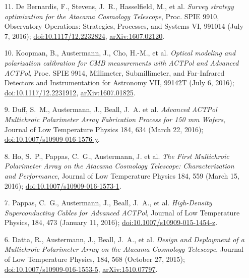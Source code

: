 \documentclass[margin,line]{res}
\begin{document}
\begin{resume}
\begin{enumerate}
{    the Advanced ACTPol experiment}, Proc. SPIE 9914, Millimeter, Submillimeter,
    and Far-Infrared Detectors and Instrumentation for Astronomy VII, 991437 (July
    19, 2016); \href{http://dx.doi.org/10.1117/12.2232824}{doi:10.1117/12.2233746}.
\item[{11.}] De Bernardis, F., Stevens, J.~R., Hasselfield, M., et al.
    \textit{Survey strategy optimization for the Atacama Cosmology Telescope},
    Proc. SPIE 9910, Observatory Operations: Strategies, Processes, and Systems
    VI, 991014 (July 7, 2016);
    \href{http://dx.doi.org/10.1117/12.2232824}{doi:10.1117/12.2232824},
    \href{https://arxiv.org/abs/1607.02120}{arXiv:1607.02120}.
\item[{10.}] Koopman, B., Austermann, J., Cho, H.-M., et al. \textit{Optical
    modeling and polarization calibration for CMB measurements with ACTPol and
    Advanced ACTPol}, Proc. SPIE 9914, Millimeter, Submillimeter, and Far-Infrared
    Detectors and Instrumentation for Astronomy VII, 99142T (July 6, 2016);
    \href{http://dx.doi.org/10.1117/12.2231912}{doi:10.1117/12.2231912},
    \href{https://arxiv.org/abs/1607.01825}{arXiv:1607.01825}.
\item[{9.}] Duff, S.~M., Austermann, J., Beall, J.~A. et al. \textit{Advanced
    ACTPol Multichroic Polarimeter Array Fabrication Process for 150 mm Wafers},
    Journal of Low Temperature Physics 184, 634 (March 22, 2016);
    \href{http://dx.doi.org/10.1007/s10909-016-1576-y}{doi:10.1007/s10909-016-1576-y}.
\item[{8.}] Ho, S.~P., Pappas, C.~G., Austermann, J. et al. \textit{The First
    Multichroic Polarimeter Array on the Atacama Cosmology Telescope:
    Characterization and Performance}, Journal of Low Temperature Physics 184, 559 (March 15, 2016);
    \href{http://dx.doi.org/10.1007/s10909-016-1573-1}{doi:10.1007/s10909-016-1573-1}.
\item[{7.}] Pappas, C.~G., Austermann, J., Beall, J.~A., et al.
    \textit{High-Density Superconducting Cables for Advanced ACTPol}, Journal of Low
    Temperature Physics, 184, 473 (January 11, 2016);
    \href{http://dx.doi.org/10.1007/s10909-015-1454-z}{doi:10.1007/s10909-015-1454-z}.
\item[{6.}] Datta, R., Austermann, J., Beall, J.~A., et al. \textit{Design and
    Deployment of a Multichroic Polarimeter Array on the Atacama Cosmology
    Telescope}, Journal of Low Temperature Physics, 184, 568 (October 27, 2015);
    \href{http://dx.doi.org/10.1007/s10909-016-1553-5}{doi:10.1007/s10909-016-1553-5},
    \href{http://arxiv.org/abs/1510.07797}{arXiv:1510.07797}.

\end{enumerate}
\end{resume}
\end{document}
